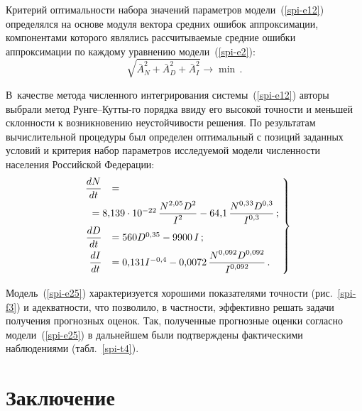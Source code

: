 {\begin{multicols}{2}
  Критерий оптимальности набора значений параметров модели~(\ref{spi-e12})
определялся на основе модуля вектора средних ошибок аппроксимации,
компонентами которого являлись рассчитываемые средние ошибки
аппроксимации по каждому уравнению модели~(\ref{spi-e2}):
\begin{equation*}
\sqrt{\bar{A}_N^2 + \bar{A}_D^2 + \bar{A}_I^2} \rightarrow \min\,.
\end{equation*}

  В~качестве метода численного интегрирования системы~(\ref{spi-e12})
авторы выбрали метод Рунге--Кутты-го порядка ввиду его высокой точности
и меньшей склонности к возникновению неустойчивости решения. По
результатам вычислительной процедуры был определен оптимальный с
позиций заданных условий и критерия набор параметров исследуемой модели
численности населения Российской Федерации:
\begin{equation}
\left.
\begin{array}{rl}
\fr{dN}{dt} & = {}\\[6pt]
&\hspace*{-8mm}{}=8{,}139 \cdot 10^{-22} \, \fr{N^{2{,}05} D^2}{I^2} -
64{,}1 \, \fr{N^{0{,}33}  D^{0{,}3}}{I^{0{,}3}}\,;\\[6pt]
\fr{dD}{dt} & = 560  D^{0{,}35} - 9900\, I\,;\\[6pt]
\fr{dI}{dt} & = 0{,}131  I^{-0{,}4} - 0{,}0072 \, \fr{N^{0{,}092}
D^{0{,}092}}{I^{0{,}092}}\,.
\end{array}\!
\right\}\!
\label{spi-e25}
\end{equation}

  Модель~(\ref{spi-e25}) характеризуется хорошими показателями точности
(рис.~\ref{spi-f3}) и адекватности, что позволило, в частности, эффективно
решать задачи получения прогнозных оценок. Так, полученные прогнозные
оценки согласно модели~(\ref{spi-e25}) в дальнейшем были подтверждены
фактическими наблюдениями (табл.~\ref{spi-t4}).


\section{Заключение} %


\end{multicols}}
